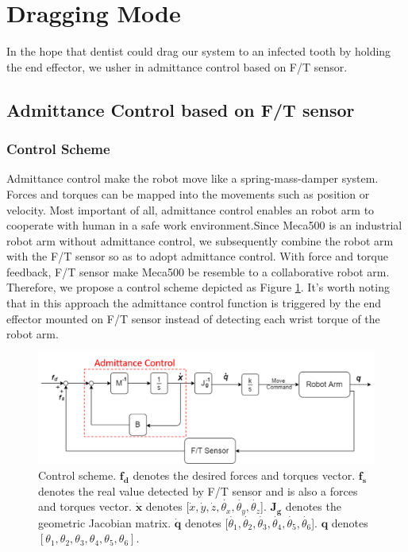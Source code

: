 \section{Dragging Mode}
In the hope that dentist could drag our system to an infected tooth by holding the end effector, we usher in admittance control based on F/T sensor.
\subsection{Admittance Control based on F/T sensor}
\label{sec:adm ctrl}
\subsubsection{Control Scheme}
Admittance control make the robot move like a spring-mass-damper system. Forces and torques can be mapped into the movements such as position or velocity. Most important of all, admittance control enables an robot arm to cooperate with human in a safe work environment.Since Meca500 is an industrial robot arm without admittance control, we subsequently combine the robot arm with the F/T sensor so as to adopt admittance control. With force and torque feedback, F/T sensor make Meca500 be resemble to a collaborative robot arm. Therefore, we propose a control scheme depicted as Figure \ref{fig:adm ctrl}. It's worth noting that in this approach the admittance control function is triggered by the end effector mounted on F/T sensor instead of detecting each wrist torque of the robot arm.
\par
\begin{figure}[htbp]
\begin{center}
\includegraphics[width=1\linewidth]{Images/adm ctrl.png}
\caption{
Control scheme. $\boldsymbol{f_d}$ denotes the desired forces and torques vector. $\boldsymbol{f_s}$ denotes the real value detected by F/T sensor and is also a forces and torques vector. $\boldsymbol{\dot{x}}$ denotes [$\dot{x}, \dot{y}, \dot{z}, \dot{\theta _x}, \dot{\theta _y}, \dot{\theta _z}$]. $\mathbf{J_g}$ denotes the geometric Jacobian matrix. $\boldsymbol{\dot{q}}$ denotes [$\dot{\theta _1}, \dot{\theta _2}, \dot{\theta _3}, \dot{\theta _4}, \dot{\theta _5}, \dot{\theta _6}$]. $\boldsymbol{q}$ denotes $\left[\theta _1, \theta _2, \theta _3, \theta _4, \theta _5, \theta _6 \right] $.
}\label{fig:adm ctrl}
\end{center}
\end{figure}
